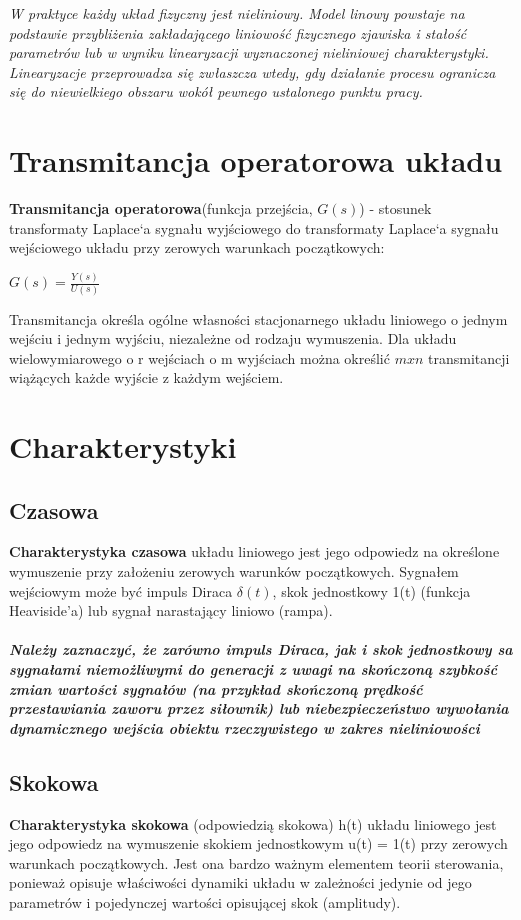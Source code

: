 \documentclass[a4paper,twoside]{report}
\begin{document}
\textit{W praktyce każdy układ fizyczny jest nieliniowy. Model linowy powstaje
	na podstawie przybliżenia zakładającego liniowość fizycznego
	zjawiska i stałość parametrów lub w wyniku linearyzacji wyznaczonej
	nieliniowej charakterystyki. Linearyzacje przeprowadza się zwłaszcza
	wtedy, gdy działanie procesu ogranicza się do niewielkiego obszaru
	wokół pewnego ustalonego punktu pracy.}
\section{Transmitancja operatorowa układu}
\textbf{Transmitancja operatorowa}(funkcja przejścia, $G(s)$) - stosunek transformaty Laplace`a sygnału wyjściowego do transformaty Laplace`a sygnału wejściowego układu przy zerowych warunkach początkowych:
\begin{center}
	$ G(s)=\frac{Y(s)}{U(s)}$
\end{center} 
Transmitancja określa ogólne własności stacjonarnego układu liniowego o jednym wejściu i jednym wyjściu, niezależne od rodzaju wymuszenia. Dla układu wielowymiarowego o r wejściach o m wyjściach można określić $ mxn$ transmitancji wiążących każde wyjście z każdym wejściem.
\section{Charakterystyki}
\subsection{Czasowa}
{\textbf{Charakterystyka czasowa}} układu liniowego jest jego odpowiedz na określone
wymuszenie przy założeniu zerowych warunków początkowych. Sygnałem
wejściowym może być impuls Diraca $ \delta(t) $, skok jednostkowy 1(t) (funkcja
Heaviside’a) lub sygnał narastający liniowo (rampa).


\paragraph{\textit{Należy zaznaczyć, że zarówno impuls Diraca, jak i skok jednostkowy sa
		sygnałami niemożliwymi do generacji z uwagi na skończoną szybkość zmian
		wartości sygnałów (na przykład skończoną prędkość przestawiania zaworu
		przez siłownik) lub niebezpieczeństwo wywołania dynamicznego wejścia
		obiektu rzeczywistego w zakres nieliniowości}}
\subsection{Skokowa}
\textbf{Charakterystyka skokowa} (odpowiedzią skokowa) h(t) układu liniowego jest
jego odpowiedz na wymuszenie skokiem jednostkowym u(t) = 1(t) przy
zerowych warunkach początkowych. Jest ona bardzo ważnym elementem teorii
sterowania, ponieważ opisuje właściwości dynamiki układu w zależności
jedynie od jego parametrów i pojedynczej wartości opisującej skok (amplitudy).
\end{document}
